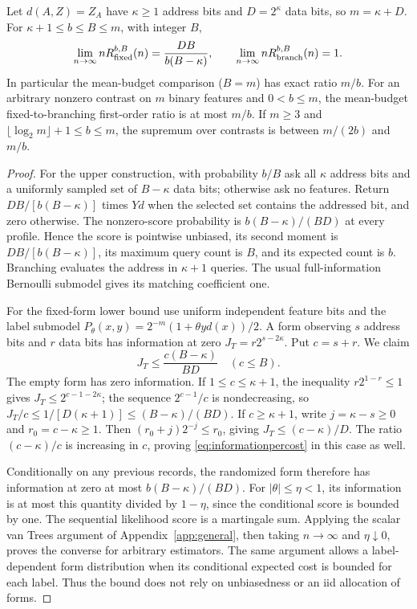 \begin{proposition}\label{prop:hybrid}
Let $d(A,Z)=Z_A$ have $\kappa\ge1$ address bits and $D=2^\kappa$ data bits, so $m=\kappa+D$.
For $\kappa+1\le b\le B\le m$, with integer $B$,
\[
 \lim_{n\to\infty}nR^{b,B}_{\rm fixed}(n)
 =\frac{DB}{b(B-\kappa)},\qquad
 \lim_{n\to\infty}nR^{b,B}_{\rm branch}(n)=1.
\]
In particular the mean-budget comparison ($B=m$) has exact ratio $m/b$.
For an arbitrary nonzero contrast on $m$ binary features and $0<b\le m$,
the mean-budget fixed-to-branching first-order ratio is at most $m/b$. If $m\ge3$ and
$\lfloor\log_2m\rfloor+1\le b\le m$, the supremum over contrasts is between
$m/(2b)$ and $m/b$.
\end{proposition}
\begin{proof}
For the upper construction, with probability $b/B$ ask all $\kappa$ address bits
and a uniformly sampled set of $B-\kappa$ data bits; otherwise ask no features.
Return $DB/[b(B-\kappa)]$ times $Yd$ when the selected set contains the addressed
bit, and zero otherwise. The nonzero-score probability is
$b(B-\kappa)/(BD)$ at every profile. Hence the score is pointwise unbiased, its
second moment is $DB/[b(B-\kappa)]$, its maximum query count is $B$, and its
expected count is $b$. Branching evaluates the address in $\kappa+1$ queries.
The usual full-information Bernoulli submodel gives its matching coefficient
one.

For the fixed-form lower bound use uniform independent feature bits and the
label submodel $P_\theta(x,y)=2^{-m}(1+\theta y d(x))/2$. A form observing
$s$ address bits and $r$ data bits has information at zero
$J_T=r2^{s-2\kappa}$. Put $c=s+r$. We claim
\begin{equation}
             J_T\le\frac{c(B-\kappa)}{BD}\quad(c\le B).
             \label{eq:informationpercost}
\end{equation}
The empty form has zero information. If $1\le c\le \kappa+1$, the inequality
$r2^{1-r}\le1$ gives $J_T\le2^{c-1-2\kappa}$; the sequence $2^{c-1}/c$ is
nondecreasing, so $J_T/c\le1/[D(\kappa+1)]\le(B-\kappa)/(BD)$.
If $c\ge \kappa+1$, write $j=\kappa-s\ge0$ and $r_0=c-\kappa\ge1$. Then
$(r_0+j)2^{-j}\le r_0$, giving $J_T\le(c-\kappa)/D$.
The ratio $(c-\kappa)/c$ is increasing in $c$, proving
\eqref{eq:informationpercost} in this case as well.

Conditionally on any previous records, the randomized form therefore has
information at zero at most $b(B-\kappa)/(BD)$. For $|\theta|\le\eta<1$, its
information is at most this quantity divided by $1-\eta$, since the
conditional score is bounded by one. The sequential likelihood score is a
martingale sum. Applying the scalar van Trees argument of
Appendix~\ref{app:general}, then taking $n\to\infty$ and $\eta\downarrow0$,
proves the converse for arbitrary estimators. The same argument allows a
label-dependent form distribution when its conditional expected cost is
bounded for each label. Thus the bound does not rely on unbiasedness or an
iid allocation of forms.


\end{proof}

